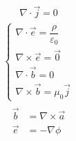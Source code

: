 \documentclass[letterpaper,10pt,english]{jupyterBook}
\begin{document}
\sphinxAtStartPar
{}
\begin{equation*}
\begin{split}\nabla \cdot \vec{j} = 0\end{split}
\end{equation*}
\sphinxAtStartPar
{}
\begin{equation*}
\begin{split}\begin{cases}
    \nabla \cdot \vec{e} = \dfrac{\rho}{\varepsilon_0} \\
    \nabla \times \vec{e} = \vec{0} \\ 
    \nabla \cdot \vec{b} = 0 \\
    \nabla \times \vec{b} = \mu_0 \vec{j} 
  \end{cases}\end{split}
\end{equation*}
\sphinxAtStartPar
{}
\begin{equation*}
\begin{split}\begin{aligned}
      \vec{b} & = \nabla \times \vec{a} \\
      \vec{e} & = - \nabla \phi \\
   \end{aligned}\end{split}
\end{equation*}
\sphinxstepscope
\end{document}
